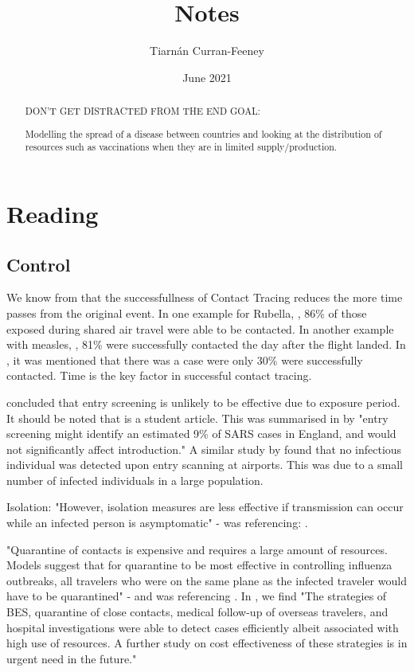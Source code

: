 \documentclass[a4paper,11pt]{article}
\title{Notes}
\author{Tiarnán Curran-Feeney}
\date{June 2021}
\theoremstyle{plain}
\theoremstyle{definition}
\begin{document}
\maketitle

\begin{abstract}
    DON'T GET DISTRACTED FROM THE END GOAL:
    
    Modelling the spread of a disease between countries and looking at the distribution of resources such as vaccinations when they are in limited supply/production.
\end{abstract}

\section{Reading}

\subsection{Control}

We know from \citep{AirTravel} that the successfullness of Contact Tracing reduces the more time passes from the original event. In one example for Rubella, \citep{ControlCT}, 86\% of those exposed during shared air travel were able to be contacted. In another example with measles, \citep{ControlCTMeasles}, 81\% were successfully contacted the day after the flight landed. In \citep{AirTravel}, it was mentioned that there was a case were only 30\% were successfully contacted. Time is the key factor in successful contact tracing.

\citep{ControlEntry} concluded that entry screening is unlikely to be effective due to exposure period. It should be noted that \citep{ControlEntry} is a student article. This was summarised in \citep{AirTravel} by "entry
screening might identify an estimated 9\% of SARS cases in
England, and would not significantly affect introduction." A similar study by \citep{ControlBorder} found that no infectious individual was detected upon entry scanning at airports. This was due to a small number of infected individuals in a large population.

Isolation: "However, isolation measures are less effective if
transmission can occur while an infected person is asymptomatic" - \citep{AirTravel} was referencing: \citep{ControlLF}.

"Quarantine of contacts is expensive and requires a large
amount of resources. Models suggest that for quarantine to
be most effective in controlling influenza outbreaks, all
travelers who were on the same plane as the infected
traveler would have to be quarantined" - \citep{AirTravel} and was referencing \citep{zhang2012characteristics}. In \citep{zhang2012characteristics}, we find "The strategies of BES,
quarantine of close contacts, medical follow-up of overseas travelers, and hospital investigations
were able to detect cases efficiently albeit associated with high use of resources. A further study
on cost effectiveness of these strategies is in urgent need in the future."
\end{document}

